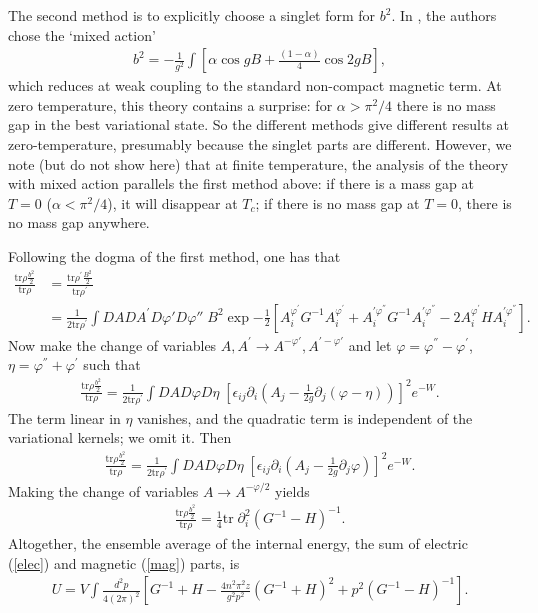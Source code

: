 \documentclass[a4paper,a4paper]{article}
\begin{document}
The second method is to explicitly choose a singlet form for $b^2$. In \cite{Kovner:1998eg}, the authors chose
the `mixed action'
\begin{gather}
b^2 = -\frac{1}{g^2} \int \left[ \alpha \cos gB + \frac{(1-\alpha)}{4} \cos 2gB \right],
\end{gather}
which reduces at weak coupling to the standard non-compact magnetic term. At zero temperature, this theory contains a surprise:
for $\alpha > \pi^2/4$ there is no mass gap in the best variational state. 
So the different methods give different results at zero-temperature, presumably because the singlet parts are different.
However, we note (but do not show here)
that at finite temperature, the analysis of the theory with mixed action parallels the first method above: if there is a mass
gap at $T=0$ ($\alpha < \pi^2/4$), it will disappear at $T_c$; if there is no mass gap at $T=0$, there is no mass gap anywhere.

Following the dogma of the first method, one has that
\begin{align}
\frac {\mathrm{tr} \rho \frac{b^2}{2}}{\mathrm{tr} \rho} &= 
\frac {\mathrm{tr} \rho^{'} \frac{B^2}{2}}{\mathrm{tr} \rho^{'}} \nonumber \\
&= \frac {1}{2\mathrm{tr} \rho^{'}} \int DA DA^{'} D \varphi' D \varphi''\; B^2
\exp{-\frac{1}{2} \left[ A_{i}^{\varphi^{'}} G^{-1} A_{i}^{\varphi^{'}} + A_{i}^{'\varphi^{''}} G^{-1} A_{i}^{'\varphi^{''}} 
- 2 A_{i}^{\varphi^{'}} H A_{i}^{'\varphi^{''}} \right] }. 
\end{align}
Now make the change of variables $A,A^{'} \rightarrow A^{-\varphi'} , A^{'-\varphi'}$ and let 
$\varphi = \varphi^{''} - \varphi^{'}$, $\eta = \varphi^{''} + \varphi^{'}$ such that
\begin{gather}
\frac {\mathrm{tr} \rho \frac{b^2}{2}}{\mathrm{tr} \rho} =
\frac {1}{2\mathrm{tr} \rho^{'}} \int DA D \varphi D \eta \;
\left[ \epsilon_{ij} \partial_i \left(A_j - \frac{1}{2g} \partial_j (\varphi - \eta)\right) \right]^2 e^{-W}.
\end{gather}
The term linear in $\eta$ vanishes, and the quadratic term is independent of the variational kernels; we omit it. Then
\begin{gather}
\frac {\mathrm{tr} \rho \frac{b^2}{2}}{\mathrm{tr} \rho} =
\frac {1}{2\mathrm{tr} \rho^{'}} \int DA D \varphi D \eta \;
\left[ \epsilon_{ij} \partial_i \left( A_j - \frac{1}{2g} \partial_j \varphi \right) \right]^2 e^{-W}.
\end{gather}
Making the change of variables $A \rightarrow A^{-\varphi /2 }$ yields
\begin{gather} \label{mag}
\frac {\mathrm{tr} \rho \frac{b^2}{2}}{\mathrm{tr} \rho} = \frac{1}{4} \mathrm{tr} \; \partial_{i}^{2} (G^{-1} - H)^{-1}.
\end{gather}
Altogether, the ensemble average of the internal energy, the sum of electric (\ref{elec}) and magnetic (\ref{mag}) parts, is
\begin{gather}
U = V \int \frac{d^2 p }{4 (2 \pi)^2} \left[ G^{-1} + H - \frac{4 n^2 \pi^2 z}{ g^2 p^2} (G^{-1} + H )^2 + p^2 (G^{-1} - H)^{-1} \right].
\end{gather}
\end{document}
